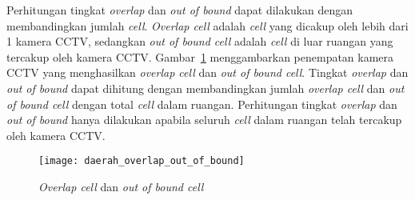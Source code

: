 Perhitungan tingkat \textit{overlap} dan \textit{out of bound} dapat dilakukan dengan membandingkan jumlah \textit{cell}. \textit{Overlap cell} adalah \textit{cell} yang dicakup oleh lebih dari 1 kamera CCTV, sedangkan \textit{out of bound cell} adalah \textit{cell} di luar ruangan yang tercakup oleh kamera CCTV. Gambar~\ref{fig:daerah_overlap_out_of_bound} menggambarkan penempatan kamera CCTV yang menghasilkan \textit{overlap cell} dan \textit{out of bound cell}. Tingkat \textit{overlap} dan \textit{out of bound} dapat dihitung dengan membandingkan jumlah \textit{overlap cell} dan \textit{out of bound cell} dengan total \textit{cell} dalam ruangan. Perhitungan tingkat \textit{overlap} dan \textit{out of bound} hanya dilakukan apabila seluruh \textit{cell} dalam ruangan telah tercakup oleh kamera CCTV.

\begin{figure}[h]
	\centering  
	\texttt{[image: daerah\_overlap\_out\_of\_bound]}
	\caption[\textit{Overlap cell} dan \textit{out of bound cell}]{\textit{Overlap cell} dan \textit{out of bound cell}}
	\label{fig:daerah_overlap_out_of_bound}
\end{figure}



